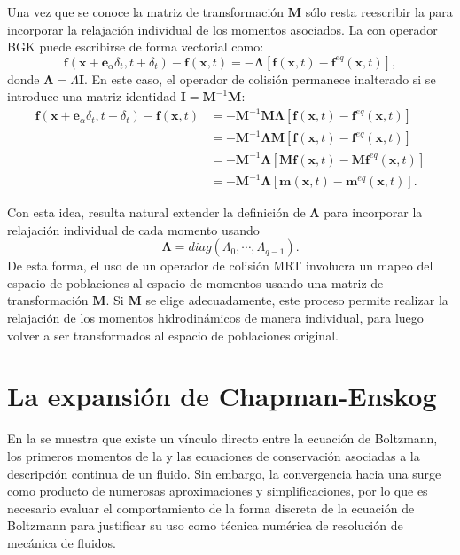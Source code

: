 Una vez que se conoce la matriz de transformaci\'on $\bm{M}$ s\'olo resta reescribir la \lbe{} para incorporar la relajaci\'on individual de los momentos asociados. La \lbe{} con operador BGK puede escribirse de forma vectorial como:
\begin{equation}
	\bm{f}(\bm{x}+\bm{e}_{\alpha}\delta_t, t+\delta_t) - \bm{f}(\bm{x},t) = -\bm{\Lambda} \left[ \bm{f}(\bm{x},t) - \bm{f}^{eq}(\bm{x},t) \right],
\end{equation}
donde $\bm{\Lambda} = \Lambda \bm{I}$. En este caso, el operador de colisi\'on permanece inalterado si se introduce una matriz identidad $\bm{I}=\bm{M}^{-1}\bm{M}$:
\begin{equation}
	\begin{aligned}
		\bm{f}(\bm{x}+\bm{e}_{\alpha}\delta_t, t+\delta_t) - \bm{f}(\bm{x},t) &= -\bm{M}^{-1}\bm{M} \bm{\Lambda} \left[ \bm{f}(\bm{x},t) - \bm{f}^{eq}(\bm{x},t) \right] \\
		&= -\bm{M}^{-1} \bm{\Lambda} \bm{M} \left[ \bm{f}(\bm{x},t) - \bm{f}^{eq}(\bm{x},t) \right] \\
		&= -\bm{M}^{-1} \bm{\Lambda} \left[ \bm{M}\bm{f}(\bm{x},t) - \bm{M}\bm{f}^{eq}(\bm{x},t) \right] \\
		&= -\bm{M}^{-1} \bm{\Lambda} \left[ \bm{m}(\bm{x},t) - \bm{m}^{eq}(\bm{x},t) \right] .	
	\end{aligned}
\end{equation}

Con esta idea, resulta natural extender la definici\'on de $\bm{\Lambda}$ para incorporar la relajaci\'on individual de cada momento usando
\begin{equation}
	\bm{\Lambda}=diag(\Lambda_0, \cdots, \Lambda_{q-1}).
\end{equation}
De esta forma, el uso de un operador de colisi\'on MRT involucra un mapeo del espacio de poblaciones al espacio de momentos usando una matriz de transformaci\'on $\bm{M}$. Si $\bm{M}$ se elige adecuadamente, este proceso permite realizar la relajaci\'on de los momentos hidrodin\'amicos de manera individual, para luego volver a ser transformados al espacio de poblaciones original.




\section{La expansi\'on de Chapman-Enskog}
\label{sec:chapman}

En la  se muestra que existe un v\'inculo directo entre la ecuaci\'on de Boltzmann, los primeros momentos de la \fdp{} y las ecuaciones de conservaci\'on asociadas a la descripci\'on continua de un fluido. Sin embargo, la convergencia hacia una \lbe{} surge como producto de numerosas aproximaciones y simplificaciones, por lo que es necesario evaluar el comportamiento de la forma discreta de la ecuaci\'on de Boltzmann para justificar su uso como t\'ecnica num\'erica de resoluci\'on de mec\'anica de fluidos.

